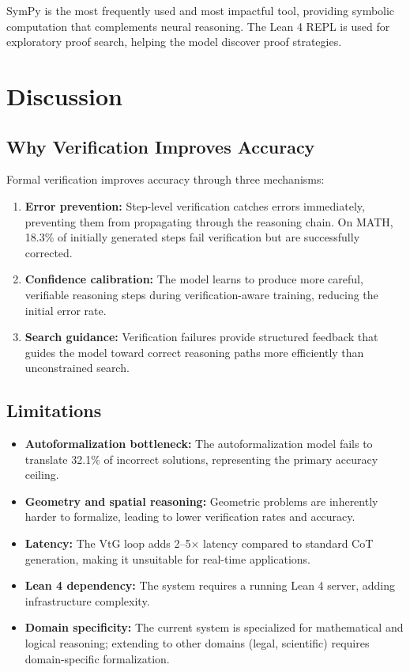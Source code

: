 \documentclass[11pt,a4paper]{article}
\begin{document}
SymPy is the most frequently used and most impactful tool, providing symbolic computation that complements neural reasoning. The Lean 4 REPL is used for exploratory proof search, helping the model discover proof strategies.

\section{Discussion}
\label{sec:discussion}

\subsection{Why Verification Improves Accuracy}

Formal verification improves accuracy through three mechanisms:

\begin{enumerate}
    \item \textbf{Error prevention:} Step-level verification catches errors immediately, preventing them from propagating through the reasoning chain. On MATH, 18.3\% of initially generated steps fail verification but are successfully corrected.
    \item \textbf{Confidence calibration:} The model learns to produce more careful, verifiable reasoning steps during verification-aware training, reducing the initial error rate.
    \item \textbf{Search guidance:} Verification failures provide structured feedback that guides the model toward correct reasoning paths more efficiently than unconstrained search.
\end{enumerate}

\subsection{Limitations}

\begin{itemize}
    \item \textbf{Autoformalization bottleneck:} The autoformalization model fails to translate 32.1\% of incorrect solutions, representing the primary accuracy ceiling.
    \item \textbf{Geometry and spatial reasoning:} Geometric problems are inherently harder to formalize, leading to lower verification rates and accuracy.
    \item \textbf{Latency:} The VtG loop adds 2--5$\times$ latency compared to standard CoT generation, making it unsuitable for real-time applications.
    \item \textbf{Lean 4 dependency:} The system requires a running Lean 4 server, adding infrastructure complexity.
    \item \textbf{Domain specificity:} The current system is specialized for mathematical and logical reasoning; extending to other domains (legal, scientific) requires domain-specific formalization.
\end{itemize}
\end{document}
